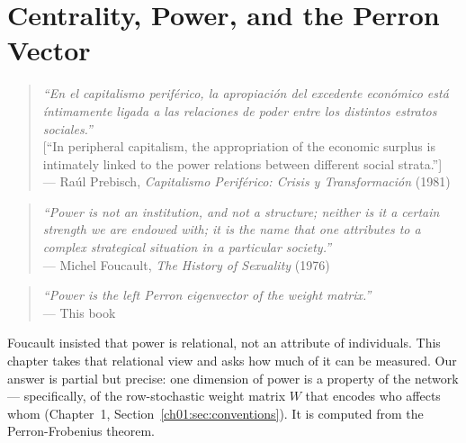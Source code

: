 \documentclass[../structural_economics_book.tex]{subfiles}
\begin{document}
\ifSubfilesClassLoaded{\setcounter{chapter}{5}}{}
\chapter{Centrality, Power, and the Perron Vector}\label{ch:06}
\begin{quote}
\textit{``En el capitalismo perif\'{e}rico, la apropiaci\'{o}n del excedente econ\'{o}mico est\'{a} \'{i}ntimamente ligada a las relaciones de poder entre los distintos estratos sociales.''}\\[0.3em]
\textnormal{[``In peripheral capitalism, the appropriation of the economic surplus is intimately linked to the power relations between different social strata.'']}\\
\hfill --- Ra\'{u}l Prebisch, \textit{Capitalismo Perif\'{e}rico: Crisis y Transformaci\'{o}n} (1981)
\end{quote}
\nocite{prebisch1981capitalismo}

\vspace{0.3em}

\begin{quote}
\textit{``Power is not an institution, and not a structure; neither is it a certain strength we are endowed with; it is the name that one attributes to a complex strategical situation in a particular society.''}\\
\hfill --- Michel Foucault, \textit{The History of Sexuality} (1976)
\end{quote}
\nocite{foucault1978history}

\vspace{0.5em}

\begin{quote}
\textit{``Power is the left Perron eigenvector of the weight matrix.''}\\
\hfill --- This book
\end{quote}

\vspace{1em}

Foucault insisted that power is relational, not an attribute of individuals. This chapter takes that relational view and asks how much of it can be measured. Our answer is partial but precise: one dimension of power is a property of the network --- specifically, of the row-stochastic weight matrix $W$ that encodes who affects whom (Chapter~1, Section~\ref{ch01:sec:conventions}). It is computed from the Perron-Frobenius theorem.
\end{document}
